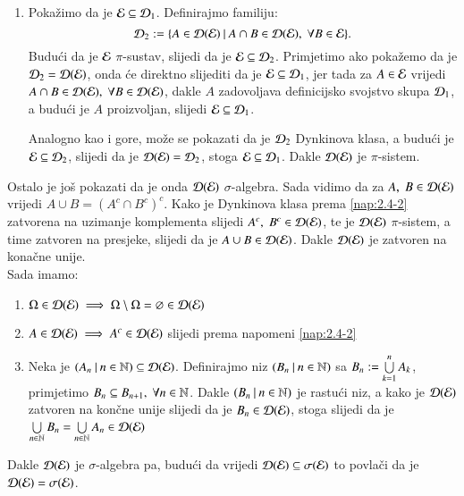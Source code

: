 \begin{rj}[\ref{zad:2.5}]
\begin{enumerate}[label=(\arabic*)]
        \item   \label{rj:2.5b}
        Poka\v zimo da je $\mathcal{E} \subseteq \mathcal{D}_1$.
        Definirajmo familiju:
        \begin{equation*}
            \mathcal{D}_2 := \{{A \in \mathcal{D}({\mathcal{E}})} \: | \: {A \cap B \in \mathcal{D}({\mathcal{E}}), \; \forall B \in \mathcal{E}}\}.
        \end{equation*}
        Budu\' ci da je $\mathcal{E}$ $\pi$-sustav, slijedi da je $\mathcal{E} \subseteq \mathcal{D}_2$. Primjetimo ako poka\v zemo da je $\mathcal{D}_2 = \mathcal{D}({\mathcal{E}})$, onda \' ce direktno slijediti da je $\mathcal{E} \subseteq \mathcal{D}_1$, jer tada za $A \in \mathcal{E}$ vrijedi $A \cap B \in \mathcal{D}({\mathcal{E}}), \; \forall B \in \mathcal{D}({\mathcal{E}})$, dakle $A$ zadovoljava definicijsko svojstvo skupa $\mathcal{D}_1$, a budu\' ci je $A$ proizvoljan, slijedi $\mathcal{E} \subseteq \mathcal{D}_1$.

        Analogno kao i gore, mo\v ze se pokazati da je $\mathcal{D}_2$ Dynkinova klasa, a budu\' ci je $\mathcal{E} \subseteq \mathcal{D}_2$, slijedi da je $\mathcal{D}({\mathcal{E}}) = \mathcal{D}_2$, stoga $\mathcal{E} \subseteq \mathcal{D}_1$. Dakle $\mathcal{D}({\mathcal{E}})$ je $\pi$-sistem.
    \end{enumerate}

    Ostalo je jo\v s pokazati da je onda $\mathcal{D}({\mathcal{E}})$ $\sigma$-algebra.
    Sada vidimo da za $A, \; B \in \mathcal{D}({\mathcal{E}})$ vrijedi $A \cup B = (A^c \cap B^c)^c$. Kako je Dynkinova klasa prema \ref{nap:2.4-2} zatvorena na uzimanje komplementa slijedi $A^c, \; B^c \in \mathcal{D}({\mathcal{E}})$, te je $\mathcal{D}({\mathcal{E}})$ $\pi$-sistem, a time zatvoren na presjeke, slijedi da je $A \cup B \in \mathcal{D}({\mathcal{E}})$. Dakle $\mathcal{D}({\mathcal{E}})$ je zatvoren na kona\v cne unije.\\
    Sada imamo:
    \begin{enumerate}[label=(\roman*)]
        \item $\Omega \in \mathcal{D}({\mathcal{E}}) \implies \Omega \setminus \Omega = \varnothing \in \mathcal{D}({\mathcal{E}})$
        \item $A \in \mathcal{D}({\mathcal{E}}) \implies A^c \in \mathcal{D}({\mathcal{E}})$ slijedi prema napomeni \ref{nap:2.4-2}
        \item Neka je $({A_n} \: | \: {n \in \mathbb{N}}) \subseteq \mathcal{D}({\mathcal{E}})$.
        Definirajmo niz $({B_n} \: | \: {n \in \mathbb{N}})$ sa $B_n := \bigcup\limits_{k = 1}^{n} A_k$, primjetimo $B_n \subseteq B_{n + 1}, \; \forall n \in \mathbb{N}$. Dakle $({B_n} \: | \: {n \in \mathbb{N}})$ je rastu\' ci niz, a kako je $\mathcal{D}({\mathcal{E}})$ zatvoren na kon\v cne unije slijedi da je $B_n \in \mathcal{D}({\mathcal{E}})$, stoga slijedi da je $\bigcup\limits_{n \in \mathbb{N}}^{} B_n = \bigcup\limits_{n \in \mathbb{N}}^{} A_n \in \mathcal{D}({\mathcal{E}})$
    \end{enumerate}
    Dakle $\mathcal{D}({\mathcal{E}})$ je $\sigma$-algebra pa, budu\' ci da vrijedi $\mathcal{D}({\mathcal{E}}) \subseteq \sigma({\mathcal{E}})$ to povla\v ci da je $\mathcal{D}({\mathcal{E}}) = \sigma({\mathcal{E}})$.
\end{rj}

